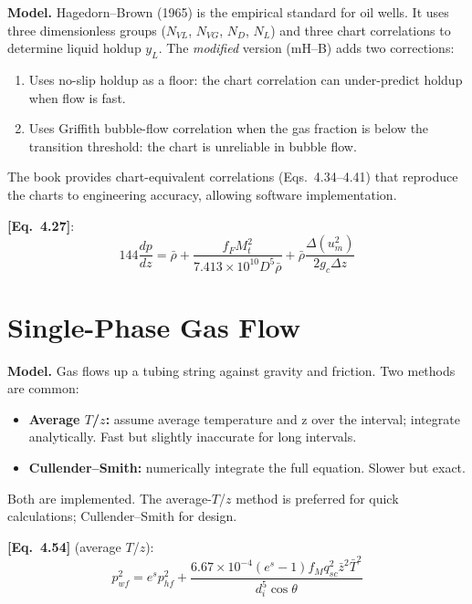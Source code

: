 \documentclass[11pt,a4paper,openany]{book}
\newcommand{\eqrefbook}[1]{\textcolor{blue!60!black}{\textbf{[Eq.~#1]}}}
\begin{document}
\begin{theory}
\textbf{Model.} Hagedorn--Brown (1965) is the empirical standard for
oil wells. It uses three dimensionless groups ($N_{VL}$, $N_{VG}$,
$N_D$, $N_L$) and three chart correlations to determine liquid holdup
$y_L$. The \emph{modified} version (mH--B) adds two corrections:
\begin{enumerate}
  \item Uses no-slip holdup as a floor: the chart correlation can
        under-predict holdup when flow is fast.
  \item Uses Griffith bubble-flow correlation when the gas fraction is
        below the transition threshold: the chart is unreliable in
        bubble flow.
\end{enumerate}

The book provides chart-equivalent correlations (Eqs.~4.34--4.41) that
reproduce the charts to engineering accuracy, allowing software
implementation.
\end{theory}

\eqrefbook{4.27}:
\begin{equation}
  144\frac{dp}{dz} = \bar{\rho} + \frac{f_F M_t^2}
  {7.413\times 10^{10} D^5 \bar{\rho}} + \bar{\rho}\frac{\Delta(u_m^2)}
  {2g_c\Delta z}
\end{equation}

\section{Single-Phase Gas Flow}

\begin{theory}
\textbf{Model.} Gas flows up a tubing string against gravity and
friction. Two methods are common:
\begin{itemize}
  \item \textbf{Average $T$/$z$:} assume average temperature and z
        over the interval; integrate analytically. Fast but slightly
        inaccurate for long intervals.
  \item \textbf{Cullender--Smith:} numerically integrate the full
        equation. Slower but exact.
\end{itemize}

Both are implemented. The average-$T$/$z$ method is preferred for
quick calculations; Cullender--Smith for design.
\end{theory}

\eqrefbook{4.54} (average $T$/$z$):
\begin{equation}
  p_{wf}^2 = e^s p_{hf}^2 + \frac{6.67\times 10^{-4}(e^s - 1)f_M q_{sc}^2
  \bar{z}^2\bar{T}^2}{d_i^5 \cos\theta}
\end{equation}
\end{document}
